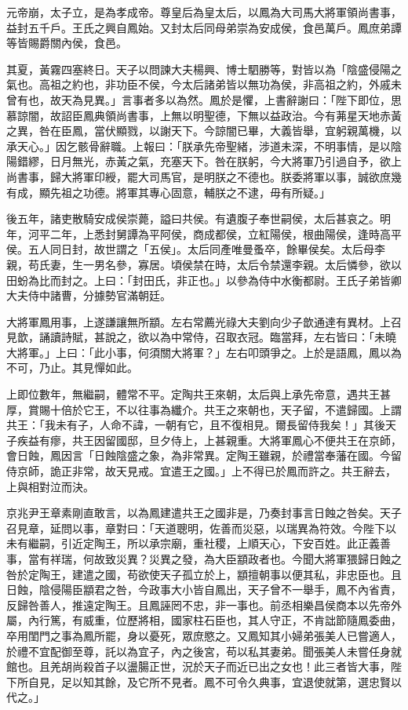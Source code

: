 \begin{pinyinscope}
元帝崩，太子立，是為孝成帝。尊皇后為皇太后，以鳳為大司馬大將軍領尚書事，益封五千戶。王氏之興自鳳始。又封太后同母弟崇為安成侯，食邑萬戶。鳳庶弟譚等皆賜爵關內侯，食邑。

其夏，黃霧四塞終日。天子以問諫大夫楊興、博士駟勝等，對皆以為「陰盛侵陽之氣也。高祖之約也，非功臣不侯，今太后諸弟皆以無功為侯，非高祖之約，外戚未曾有也，故天為見異。」言事者多以為然。鳳於是懼，上書辭謝曰：「陛下即位，思慕諒闇，故詔臣鳳典領尚書事，上無以明聖德，下無以益政治。今有茀星天地赤黃之異，咎在臣鳳，當伏顯戮，以謝天下。今諒闇已畢，大義皆舉，宜躬親萬機，以承天心。」因乞骸骨辭職。上報曰：「朕承先帝聖緒，涉道未深，不明事情，是以陰陽錯繆，日月無光，赤黃之氣，充塞天下。咎在朕躬，今大將軍乃引過自予，欲上尚書事，歸大將軍印綬，罷大司馬官，是明朕之不德也。朕委將軍以事，誠欲庶幾有成，顯先祖之功德。將軍其專心固意，輔朕之不逮，毋有所疑。」

後五年，諸吏散騎安成侯崇薨，謚曰共侯。有遺腹子奉世嗣侯，太后甚哀之。明年，河平二年，上悉封舅譚為平阿侯，商成都侯，立紅陽侯，根曲陽侯，逢時高平侯。五人同日封，故世謂之「五侯」。太后同產唯曼蚤卒，餘畢侯矣。太后母李親，苟氏妻，生一男名參，寡居。頃侯禁在時，太后令禁還李親。太后憐參，欲以田蚡為比而封之。上曰：「封田氏，非正也。」以參為侍中水衡都尉。王氏子弟皆卿大夫侍中諸曹，分據勢官滿朝廷。

大將軍鳳用事，上遂謙讓無所顓。左右常薦光祿大夫劉向少子歆通達有異材。上召見歆，誦讀詩賦，甚說之，欲以為中常侍，召取衣冠。臨當拜，左右皆曰：「未曉大將軍。」上曰：「此小事，何須關大將軍？」左右叩頭爭之。上於是語鳳，鳳以為不可，乃止。其見憚如此。

上即位數年，無繼嗣，體常不平。定陶共王來朝，太后與上承先帝意，遇共王甚厚，賞賜十倍於它王，不以往事為纖介。共王之來朝也，天子留，不遣歸國。上謂共王：「我未有子，人命不諱，一朝有它，且不復相見。爾長留侍我矣！」其後天子疾益有瘳，共王因留國邸，旦夕侍上，上甚親重。大將軍鳳心不便共王在京師，會日蝕，鳳因言「日蝕陰盛之象，為非常異。定陶王雖親，於禮當奉藩在國。今留侍京師，詭正非常，故天見戒。宜遣王之國。」上不得已於鳳而許之。共王辭去，上與相對泣而決。

京兆尹王章素剛直敢言，以為鳳建遣共王之國非是，乃奏封事言日蝕之咎矣。天子召見章，延問以事，章對曰：「天道聰明，佐善而災惡，以瑞異為符效。今陛下以未有繼嗣，引近定陶王，所以承宗廟，重社稷，上順天心，下安百姓。此正義善事，當有祥瑞，何故致災異？災異之發，為大臣顓政者也。今聞大將軍猥歸日蝕之咎於定陶王，建遣之國，苟欲使天子孤立於上，顓擅朝事以便其私，非忠臣也。且日蝕，陰侵陽臣顓君之咎，今政事大小皆自鳳出，天子曾不一舉手，鳳不內省責，反歸咎善人，推遠定陶王。且鳳誣罔不忠，非一事也。前丞相樂昌侯商本以先帝外屬，內行篤，有威重，位歷將相，國家柱石臣也，其人守正，不肯詘節隨鳳委曲，卒用閨門之事為鳳所罷，身以憂死，眾庶愍之。又鳳知其小婦弟張美人已嘗適人，於禮不宜配御至尊，託以為宜子，內之後宮，苟以私其妻弟。聞張美人未嘗任身就館也。且羌胡尚殺首子以盪腸正世，況於天子而近已出之女也！此三者皆大事，陛下所自見，足以知其餘，及它所不見者。鳳不可令久典事，宜退使就第，選忠賢以代之。」


\end{pinyinscope}

